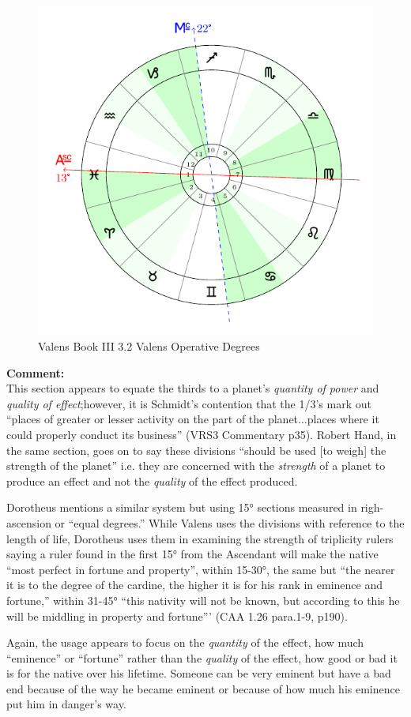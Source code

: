 \begin{figure}[H]
\includegraphics[width=\textwidth]{charts/3_02_Valens_opdegs}
\caption{Valens Book III 3.2 Valens Operative Degrees}
\end{figure}

\begin{mdframed}[backgroundcolor=cyan!5]
\small
\textbf{Comment:} \hfill \\
This section appears to equate the thirds to a planet's \textsl{quantity of power} and \textsl{quality of effect};however, it is Schmidt's contention that the 1/3's mark out ``places of greater or lesser activity on the part of the planet...places where it could properly conduct its business'' (VRS3 Commentary p35). Robert Hand, in the same section, goes on to say these divisions ``should be used [to weigh] the strength of the planet'' i.e. they are concerned with the \textsl{strength} of a planet to produce an effect and not the \textsl{quality} of the effect produced.

Dorotheus mentions a similar system but using 15° sections measured in righ-ascension or ``equal degrees.'' While Valens uses the divisions with reference to the length of life, Dorotheus uses them in examining the strength of triplicity rulers saying a ruler found in the first 15° from the Ascendant will make the native ``most perfect in fortune and property'', within 15-30°, the same but ``the nearer it is to the degree of the cardine, the higher it is for his rank in eminence and fortune,'' within 31-45° ``this nativity will not be known, but according to this he will be middling in property and fortune'''  (CAA 1.26 para.1-9, p190). 

Again, the usage appears to focus on the \textsl{quantity} of the effect, how much ``eminence'' or ``fortune'' rather than the \textsl{quality} of the effect, how good or bad it is for the native over his lifetime. Someone can be very eminent but have a bad end because of the way he became eminent or because of how much his eminence put him in danger's way.
\end{mdframed}

\newpage